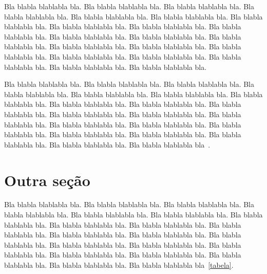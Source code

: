 \documentclass[tcc,capa]{texufpel}
\begin{document}
Bla blabla blablabla bla.  Bla blabla blablabla bla.  Bla blabla
blablabla bla.  Bla blabla blablabla bla.  Bla blabla blablabla bla.
Bla blabla blablabla bla.  Bla blabla blablabla bla.  Bla blabla
blablabla bla.  Bla blabla blablabla bla.  Bla blabla blablabla bla.
Bla blabla blablabla bla.  Bla blabla blablabla bla.  Bla blabla
blablabla bla.  Bla blabla blablabla bla.  Bla blabla blablabla bla.
Bla blabla blablabla bla.  Bla blabla blablabla bla.  Bla blabla
blablabla bla.  Bla blabla blablabla bla.  Bla blabla blablabla bla.
Bla blabla blablabla bla.

Bla blabla blablabla bla.  Bla blabla blablabla bla.  Bla blabla
blablabla bla.  Bla blabla blablabla bla.  Bla blabla blablabla bla.
Bla blabla blablabla bla.  Bla blabla blablabla bla.  Bla blabla
blablabla bla.  Bla blabla blablabla bla.  Bla blabla blablabla bla.
Bla blabla blablabla bla.  Bla blabla blablabla bla.  Bla blabla
blablabla bla.  Bla blabla blablabla bla.  Bla blabla blablabla bla.
Bla blabla blablabla bla.  Bla blabla blablabla bla.  Bla blabla
blablabla bla.  Bla blabla blablabla bla.  Bla blabla blablabla bla.
Bla blabla blablabla bla~\cite{vonNeumann:1966:TSR}.

\section{Outra seção}

Bla blabla blablabla bla.  Bla blabla blablabla bla.  Bla blabla
blablabla bla.  Bla blabla blablabla bla.  Bla blabla blablabla bla.
Bla blabla blablabla bla.  Bla blabla blablabla bla.  Bla blabla
blablabla bla.  Bla blabla blablabla bla.  Bla blabla blablabla bla.
Bla blabla blablabla bla.  Bla blabla blablabla bla.  Bla blabla
blablabla bla.  Bla blabla blablabla bla.  Bla blabla blablabla bla.
Bla blabla blablabla bla.  Bla blabla blablabla bla.  Bla blabla
blablabla bla.  Bla blabla blablabla bla.  Bla blabla blablabla bla.
Bla blabla blablabla bla~\ref{tabela}.
\end{document}
